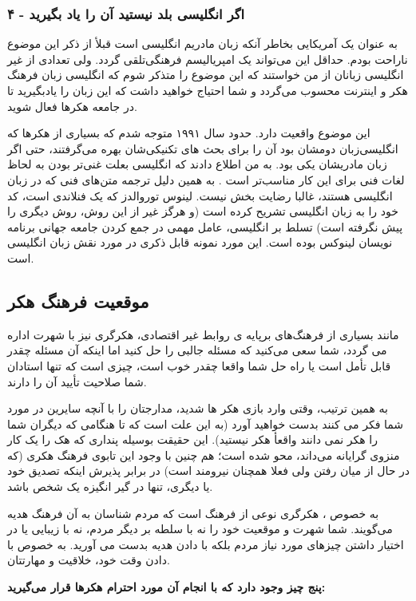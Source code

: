 \subsubsection*{۴ - اگر انگلیسی ‌بلد نیستید آن را یاد بگیرید}
به عنوان یک آمریکایی بخاطر آنکه زبان مادریم انگلیسی است قبلأ از ذکر این موضوع ناراحت بودم. حداقل این می‌تواند یک امپریالیسم فرهنگی‌تلقی‌ گردد. ولی تعدادی از غیر انگلیسی زبانان از من خواستند که این موضوع را متذکر شوم که انگلیسی زبان فرهنگ هکر و اینترنت محسوب می‌گردد و شما احتیاج خواهید داشت که این زبان را یادبگیرید تا در جامعه هکرها فعال شوید.

این موضوع واقعیت دارد. حدود سال ۱۹۹۱ متوجه شدم که بسیاری از هکرها که انگلیسی‌زبان دومشان بود آن را برای بحث های تکنیکی‌شان بهره می‌گرفتند، حتی اگر زبان مادریشان یکی بود. به من اطلاع دادند که انگلیسی بعلت غنی‌تر بودن به لحاظ لغات فنی برای این کار مناسب‌تر است . به همین دلیل ترجمه متن‌های فنی که در زبان انگلیسی هستند، غالبا رضایت بخش نیست. لینوس توروالدز که یک فنلاندی است، کد خود را به زبان انگلیسی تشریح کرده است (و هرگز غیر از این روش، روش دیگری را پیش نگرفته است) تسلط بر انگلیسی، عامل مهمی در جمع کردن جامعه جهانی برنامه نویسان لینوکس بوده است. این مورد نمونه قابل ذکری در مورد نقش زبان انگلیسی است.
\subsection*{موقعیت فرهنگ هکر}
مانند بسیاری از فرهنگ‌های برپایه ی روابط غیر اقتصادی، هکرگری نیز با شهرت اداره می گردد، شما سعی می‌کنید که مسئله جالبی را حل کنید اما اینکه آن مسئله چقدر قابل تأمل است یا راه حل شما واقعا چقدر خوب است، چیزی است که تنها استادان شما صلاحیت تأیید آن را دارند.

به همین ترتیب، وقتی وارد بازی هکر ها شدید، مدارجتان را با آنچه سایرین در مورد شما فکر می کنند بدست خواهید آورد (به این علت است که تا هنگامی که دیگران شما را هکر نمی دانند واقعأ هکر نیستید). این حقیقت بوسیله پنداری که هک را یک کار منزوی گرایانه می‌داند، محو شده است؛ هم چنین با وجود این تابوی فرهنگ هکری (که در حال از میان رفتن ولی فعلا همچنان نیرومند است) در برابر پذیرش اینکه تصدیق خود یا دیگری، تنها در گیر انگیزه یک شخص باشد.

به خصوص ، هکرگری نوعی از فرهنگ است که مردم شناسان به آن فرهنگ هدیه می‌گویند. شما شهرت و موقعیت خود را نه با سلطه بر دیگر مردم، نه با زیبایی یا در اختیار داشتن چیزهای مورد نیاز مردم بلکه با دادن هدیه بدست می آورید. به خصوص با دادن وقت خود، خلاقیت و مهارتتان.

\textbf{پنج چیز وجود دارد که با انجام آن مورد احترام هکرها قرار می‌گیرید:}
